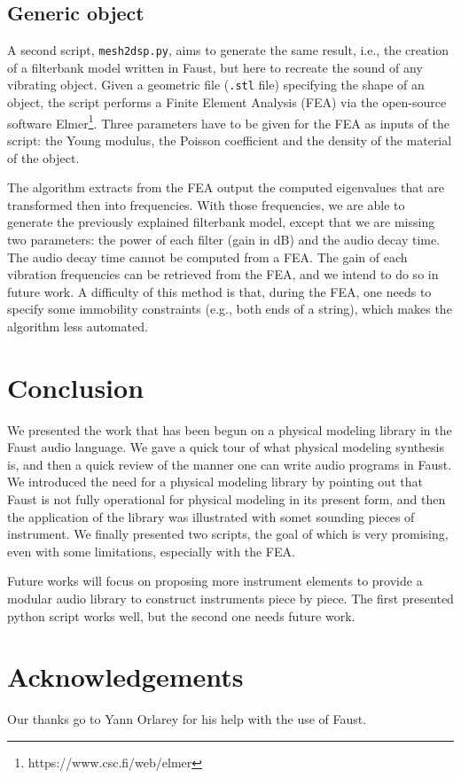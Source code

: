 \documentclass[11pt,a4paper]{article}
\begin{document}
\subsection*{Generic object}

A second script, \texttt{mesh2dsp.py}, aims to generate the same result, i.e., the creation of a filterbank model written in Faust, but here to recreate the sound of any vibrating object. Given a geometric file (\texttt{.stl} file) specifying the shape of an object, the script performs a Finite Element Analysis (FEA) via the open-source software Elmer\footnote{https://www.csc.fi/web/elmer}. Three parameters have to be given for the FEA as inputs of the script: the Young modulus, the Poisson coefficient and the density of the material of the object.

The algorithm extracts from the FEA output the computed eigenvalues that are transformed then into frequencies. With those frequencies, we are able to generate the previously explained filterbank model, except that we are missing two parameters: the power of each filter (gain in dB) and the audio decay time. The audio decay time cannot be computed from a FEA. The gain of each vibration frequencies can be retrieved from the FEA, and we intend to do so in future work. 
A difficulty of this method is that, during the FEA, one needs to specify some immobility constraints (e.g., both ends of a string), which makes the algorithm less automated.

\section{Conclusion}

We presented the work that has been begun on a physical modeling library in the Faust audio language. We gave a quick tour of what physical modeling synthesis is, and then a quick review of the manner one can write audio programs in Faust. We introduced the need for a physical modeling library by pointing out that Faust is not fully operational for physical modeling in its present form, and then the application of the library was illustrated with somet sounding pieces of instrument. We finally presented two scripts, the goal of which is very promising, even with some limitations, especially with the FEA.

Future works will focus on proposing more instrument elements to provide a modular audio library to construct instruments piece by piece. The first presented python script works well, but the second one needs future work.

\section{Acknowledgements}

Our thanks go to Yann Orlarey for his help with the use of Faust.



\end{document}
